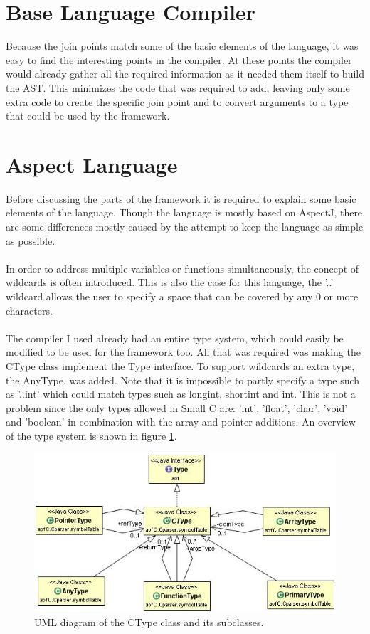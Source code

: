 \documentclass[a4paper]{report}
\begin{document}
\section{Base Language Compiler}
Because the join points match some of the basic elements of the language, it was easy to find the interesting points in the compiler. At these points the compiler would already gather all the required information as it needed them itself to build the AST. This minimizes the code that was required to add, leaving only some extra code to create the specific join point and to convert arguments to a type that could be used by the framework.

\section{Aspect Language}
Before discussing the parts of the framework it is required to explain some basic elements of the language. Though the language is mostly based on AspectJ, there are some differences mostly caused by the attempt to keep the language as simple as possible.\\
\\
In order to address multiple variables or functions simultaneously, the concept of wildcards is often introduced. This is also the case for this language, the '..' wildcard allows the user to specify a space that can be covered by any 0 or more characters.\\
\\
The compiler I used already had an entire type system, which could easily be modified to be used for the framework too. All that was required was making the CType class implement the Type interface. To support wildcards an extra type, the AnyType, was added. Note that it is impossible to partly specify a type such as '..int' which could match types such as longint, shortint and int. This is not a problem since the only types allowed in Small C are: 'int', 'float', 'char', 'void' and 'boolean' in combination with the array and pointer additions. An overview of the type system is shown in figure \ref{fig:CType}.\\
\begin{figure}[h!]
\centering
\includegraphics[scale=0.7]{images/AOFC/CType.jpg}
\caption{UML diagram of the CType class and its subclasses.}
\label{fig:CType}
\end{figure}
\end{document}
